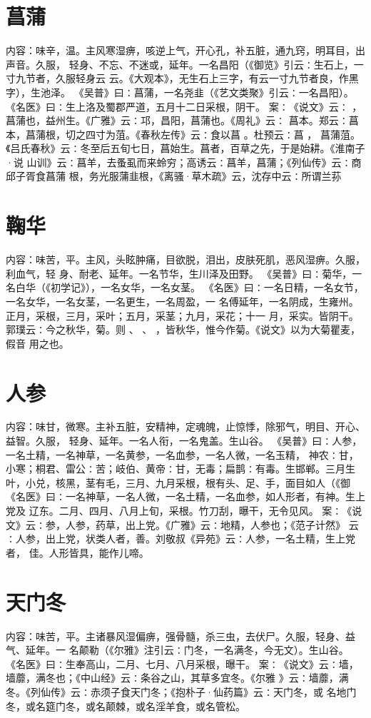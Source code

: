 \documentclass[12pt,UTF8]{ctexbook}
\begin{document}
\section{菖蒲}
内容：味辛，温。主风寒湿痹，咳逆上气，开心孔，补五脏，通九窍，明耳目，出声音。久服， 
轻身、不忘、不迷或，延年。一名昌阳（《御览》引云∶生石上，一寸九节者，久服轻身云 
云。《大观本》，无生石上三字，有云一寸九节者良，作黑字），生池泽。 
《吴普》曰∶菖蒲，一名尧韭（《艺文类聚》引云∶一名昌阳）。 
《名医》曰∶生上洛及蜀郡严道，五月十二日采根，阴干。 
案∶《说文》云∶ ，菖蒲也，益州生。《广雅》云∶邛，昌阳，菖蒲也。《周礼》云∶ 
菖本。郑云∶菖本，菖蒲根，切之四寸为菹。《春秋左传》云∶食以菖 。杜预云∶菖 ， 
菖蒲菹。《吕氏春秋》云∶冬至后五旬七日，菖始生。菖者，百草之先，于是始耕。《淮南子·说 
山训》云∶菖羊，去蚤虱而来蛉穷；高诱云∶菖羊，菖蒲；《列仙传》云∶商邱子胥食菖蒲 
根，务光服蒲韭根，《离骚·草木疏》云，沈存中云∶所谓兰荪 


\section{鞠华}
内容：味苦，平。主风，头眩肿痛，目欲脱，泪出，皮肤死肌，恶风湿痹。久服，利血气，轻 
身、耐老、延年。一名节华，生川泽及田野。 
《吴普》曰∶菊华，一名白华（《初学记》），一名女华，一名女茎。 
《名医》曰∶一名日精，一名女节，一名女华，一名女茎，一名更生，一名周盈，一 
名傅延年，一名阴成，生雍州。正月，采根，三月，采叶；五月，采茎；九月，采花；十一 
月，采实。皆阴干。 
郭璞云∶今之秋华，菊。则 、 、 ，皆秋华，惟今作菊。《说文》以为大菊瞿麦， 
假音 
用之也。 


\section{人参}
内容：味甘，微寒。主补五脏，安精神，定魂魄，止惊悸，除邪气，明目、开心、益智。久服， 
轻身、延年。一名人衔，一名鬼盖。生山谷。 
《吴普》曰∶人参，一名土精，一名神草，一名黄参，一名血参，一名人微，一名玉精， 
神农∶甘，小寒；桐君、雷公∶苦；岐伯、黄帝∶甘，无毒；扁鹊∶有毒。生邯郸。三月生 
叶，小兑，核黑，茎有毛，三月、九月采根，根有头、足、手，面目如人（《御 
《名医》曰∶一名神草，一名人微，一名土精，一名血参，如人形者，有神。生上党及 
辽东。二月、四月、八月上旬，采根。竹刀刮，曝干，无令见风。 
案∶《说文》云∶参，人参，药草，出上党。《广雅》云∶地精，人参也；《范子计然》 
云∶人参，出上党，状类人者，善。刘敬叔《异苑》云∶人参，一名土精，生上党者， 
佳。人形皆具，能作儿啼。 


\section{天门冬}
内容：味苦，平。主诸暴风湿偏痹，强骨髓，杀三虫，去伏尸。久服，轻身、益气、延年。一 
名颠勒（《尔雅》注引云∶门冬，一名满冬，今无文）。生山谷。 
《名医》曰∶生奉高山，二月、七月、八月采根，曝干。 
案∶《说文》云∶墙，墙蘼，满冬也；《中山经》云∶条谷之山，其草多宜冬。《尔雅 
》云∶墙蘼，满冬。《列仙传》云∶赤须子食天门冬；《抱朴子·仙药篇》云∶天门冬，或 
名地门冬，或名筵门冬，或名颠棘，或名淫羊食，或名管松。 
\end{document}
